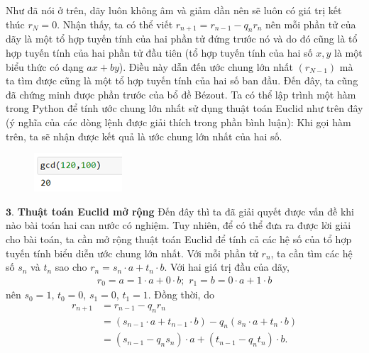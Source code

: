	\begin{multicols}{2}
	Như đã nói ở trên, dãy luôn không âm và giảm dần nên sẽ luôn có giá trị kết thúc $r_N=0$. Nhận thấy, ta có thể viết $r_{n+1}=r_{n-1}-q_n r_n$ nên mỗi phần tử của dãy là một tổ hợp tuyến tính của hai phần tử đứng trước nó và do đó cũng là tổ hợp tuyến tính của hai phần tử đầu tiên (tổ hợp tuyến tính của hai số $x, y$ là một biểu thức có dạng $ax+by$). Điều này dẫn đến ước chung lớn nhất $(r_{N-1})$ mà ta tìm được cũng là một tổ hợp tuyến tính của hai số ban đầu. Đến đây, ta cũng đã chứng minh được phần trước của bổ đề Bézout.
	\vskip 0.1cm
	Ta có thể lập trình một hàm trong Python để tính ước chung lớn nhất sử dụng thuật toán Euclid như trên đây (ý nghĩa của các dòng lệnh được giải thích trong phần bình luận):
	\vskip 0.1cm
	Khi gọi hàm trên, ta sẽ nhận được kết quả là ước chung lớn nhất của hai số.
	\begin{figure}[H]
		\centering
		\vspace*{-10pt}
		\captionsetup{labelformat= empty, justification=centering}
		\includegraphics[width=0.4\linewidth]{3}
		\vspace*{-15pt}
	\end{figure}
	$\pmb{3.}$ \textbf{\color{hoccungpi}Thuật toán Euclid mở rộng}
	\vskip 0.1cm
	Đến đây thì ta đã giải quyết được vấn đề khi nào bài toán hai can nước có nghiệm. Tuy nhiên, để có thể đưa ra được lời giải cho bài toán, ta cần mở rộng thuật toán Euclid để tính cả các hệ số của tổ hợp tuyến tính biểu diễn ước chung lớn nhất. Với mỗi phần tử $r_n$, ta cần tìm các hệ số $s_n$ và $t_n$ sao cho $r_n=s_n\cdot a+t_n\cdot b$.
	\vskip 0.1cm
	Với hai giá trị đầu của dãy,
	\setlength{\abovedisplayskip}{5pt}
	\setlength{\belowdisplayskip}{5pt}
	\begin{align*}
		r_0=a=1\cdot a\!+\!0\cdot b;\,\,
		r_1=b=0\cdot a\!+\!1\cdot b
	\end{align*}
	nên $s_0=1$, $t_0=0$, $s_1=0$, $t_1=1$.
	\vskip 0.1cm
	Đồng thời, do
	\begin{align*}
		r_{n+1}&=r_{n-1}-q_n r_n\\
		&=\left(s_{n\!-\!1}\!\cdot\! a+t_{n-1}\!\cdot\! b\right)-q_n \left(s_n\!\cdot\! a+t_n\!\cdot \!b\right)\\
		&=\left(s_{n-1}-q_n s_n \right)\cdot a+\left(t_{n-1}-q_n t_n \right)\cdot b. 

\end{align*}
\end{multicols}
